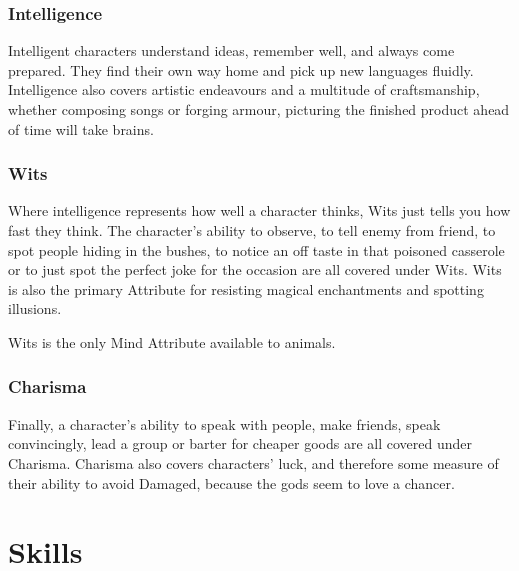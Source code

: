 \begin{multicols}{2}
\subsubsection[Intelligence]{Intelligence }

Intelligent characters understand ideas, remember well, and always come prepared.
They find their own way home and pick up new languages fluidly.
Intelligence also covers artistic endeavours and a multitude of craftsmanship, whether composing songs or forging armour, picturing the finished product ahead of time will take brains.

\subsubsection[Wits]{Wits }

Where intelligence represents how well a character thinks, Wits just tells you how fast they think.
The character's ability to observe, to tell enemy from friend, to spot people hiding in the bushes, to notice an off taste in that poisoned casserole or to just spot the perfect joke for the occasion are all covered under Wits.
Wits is also the primary Attribute for resisting magical enchantments and spotting illusions.

Wits is the only Mind Attribute available to animals.

\subsubsection[Charisma]{Charisma }

Finally, a character's ability to speak with people, make friends, speak convincingly, lead a group or barter for cheaper goods are all covered under Charisma.
Charisma also covers characters' luck, and therefore some measure of their ability to avoid Damaged, because the gods seem to love a chancer.

\end{multicols}

\section{Skills}

\label{skills}

